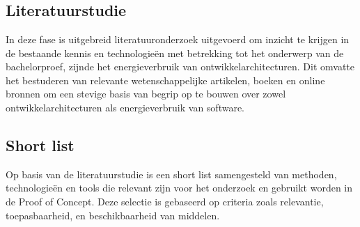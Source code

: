 
\chapter{}%
\label{ch:methodologie}

\section{Literatuurstudie}
In deze fase is uitgebreid literatuuronderzoek uitgevoerd om inzicht te krijgen in de bestaande kennis en technologieën met betrekking tot het onderwerp van de bachelorproef, zijnde het energieverbruik van ontwikkelarchitecturen. Dit omvatte het bestuderen van relevante wetenschappelijke artikelen, boeken en online bronnen om een stevige basis van begrip op te bouwen over zowel ontwikkelarchitecturen als energieverbruik van software.


\section{Short list}
Op basis van de literatuurstudie is een short list samengesteld van methoden, technologieën en tools die relevant zijn voor het onderzoek en gebruikt worden in de Proof of Concept. Deze selectie is gebaseerd op criteria zoals relevantie, toepasbaarheid, en beschikbaarheid van middelen.


